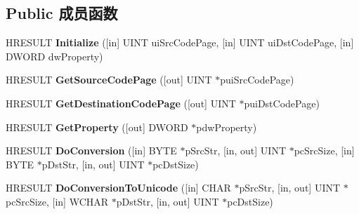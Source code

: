 \subsection*{Public 成员函数}
\begin{DoxyCompactItemize}
\item 
\mbox{\label{interface_multi_language_1_1_i_m_lang_convert_charset_a1a390180b9fe1b74b02480d863934478}} 
H\+R\+E\+S\+U\+LT {\bfseries Initialize} (\mbox{[}in\mbox{]} U\+I\+NT ui\+Src\+Code\+Page, \mbox{[}in\mbox{]} U\+I\+NT ui\+Dst\+Code\+Page, \mbox{[}in\mbox{]} D\+W\+O\+RD dw\+Property)
\item 
\mbox{\label{interface_multi_language_1_1_i_m_lang_convert_charset_ab6f5e6dc7566889604e3bb97057576e8}} 
H\+R\+E\+S\+U\+LT {\bfseries Get\+Source\+Code\+Page} (\mbox{[}out\mbox{]} U\+I\+NT $\ast$pui\+Src\+Code\+Page)
\item 
\mbox{\label{interface_multi_language_1_1_i_m_lang_convert_charset_a7f08fe28afd2edd4cf8eb72e4c35e928}} 
H\+R\+E\+S\+U\+LT {\bfseries Get\+Destination\+Code\+Page} (\mbox{[}out\mbox{]} U\+I\+NT $\ast$pui\+Dst\+Code\+Page)
\item 
\mbox{\label{interface_multi_language_1_1_i_m_lang_convert_charset_afd2a3ef763d524b4bfbb7a36f382c4e8}} 
H\+R\+E\+S\+U\+LT {\bfseries Get\+Property} (\mbox{[}out\mbox{]} D\+W\+O\+RD $\ast$pdw\+Property)
\item 
\mbox{\label{interface_multi_language_1_1_i_m_lang_convert_charset_aa27b4ffe7a3e42f6ede748ef7914271e}} 
H\+R\+E\+S\+U\+LT {\bfseries Do\+Conversion} (\mbox{[}in\mbox{]} B\+Y\+TE $\ast$p\+Src\+Str, \mbox{[}in, out\mbox{]} U\+I\+NT $\ast$pc\+Src\+Size, \mbox{[}in\mbox{]} B\+Y\+TE $\ast$p\+Dst\+Str, \mbox{[}in, out\mbox{]} U\+I\+NT $\ast$pc\+Dst\+Size)
\item 
\mbox{\label{interface_multi_language_1_1_i_m_lang_convert_charset_a748b77ac10113d1524ef90809351b7c7}} 
H\+R\+E\+S\+U\+LT {\bfseries Do\+Conversion\+To\+Unicode} (\mbox{[}in\mbox{]} C\+H\+AR $\ast$p\+Src\+Str, \mbox{[}in, out\mbox{]} U\+I\+NT $\ast$pc\+Src\+Size, \mbox{[}in\mbox{]} W\+C\+H\+AR $\ast$p\+Dst\+Str, \mbox{[}in, out\mbox{]} U\+I\+NT $\ast$pc\+Dst\+Size)

\end{DoxyCompactItemize}
